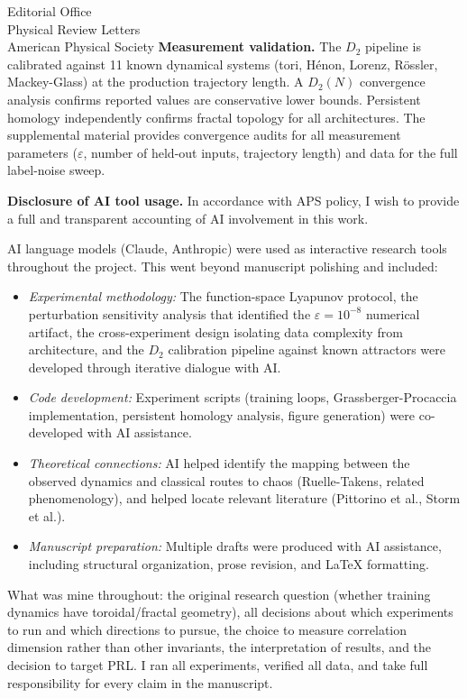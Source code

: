 \documentclass[11pt]{letter}
\begin{document}
\begin{letter}{%
Editorial Office\\
Physical Review Letters\\
American Physical Society}
\textbf{Measurement validation.} The $D_2$ pipeline is calibrated against 11 known dynamical systems (tori, H\'{e}non, Lorenz, R\"{o}ssler, Mackey-Glass) at the production trajectory length. A $D_2(N)$ convergence analysis confirms reported values are conservative lower bounds. Persistent homology independently confirms fractal topology for all architectures. The supplemental material provides convergence audits for all measurement parameters ($\varepsilon$, number of held-out inputs, trajectory length) and data for the full label-noise sweep.

\textbf{Disclosure of AI tool usage.} In accordance with APS policy, I wish to provide a full and transparent accounting of AI involvement in this work.

AI language models (Claude, Anthropic) were used as interactive research tools throughout the project. This went beyond manuscript polishing and included:

\begin{itemize}
\item \textit{Experimental methodology:} The function-space Lyapunov protocol, the perturbation sensitivity analysis that identified the $\varepsilon = 10^{-8}$ numerical artifact, the cross-experiment design isolating data complexity from architecture, and the $D_2$ calibration pipeline against known attractors were developed through iterative dialogue with AI.
\item \textit{Code development:} Experiment scripts (training loops, Grassberger-Procaccia implementation, persistent homology analysis, figure generation) were co-developed with AI assistance.
\item \textit{Theoretical connections:} AI helped identify the mapping between the observed dynamics and classical routes to chaos (Ruelle-Takens, related phenomenology), and helped locate relevant literature (Pittorino et al., Storm et al.).
\item \textit{Manuscript preparation:} Multiple drafts were produced with AI assistance, including structural organization, prose revision, and \LaTeX{} formatting.
\end{itemize}

What was mine throughout: the original research question (whether training dynamics have toroidal/fractal geometry), all decisions about which experiments to run and which directions to pursue, the choice to measure correlation dimension rather than other invariants, the interpretation of results, and the decision to target PRL. I ran all experiments, verified all data, and take full responsibility for every claim in the manuscript.


\end{letter}
\end{document}
